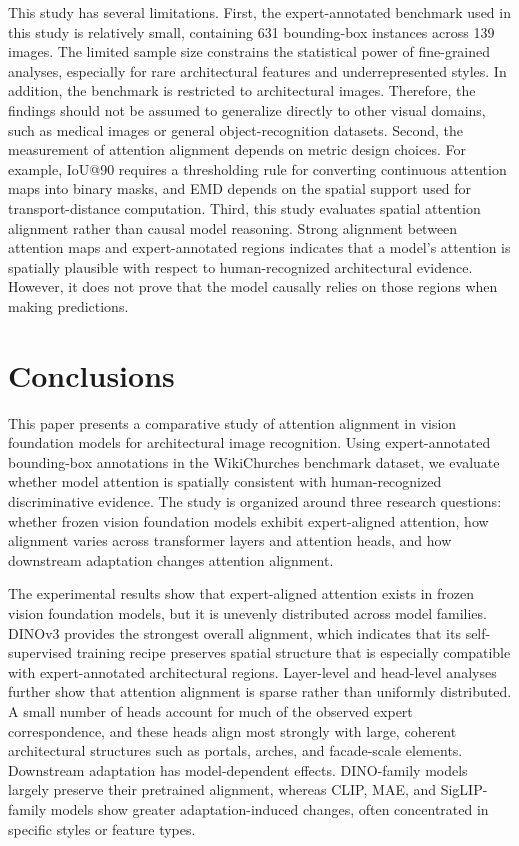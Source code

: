 \documentclass[lineno,pdflatex,sn-mathphys-num]{sn-jnl}%
\theoremstyle{thmstyleone}%
\theoremstyle{thmstyletwo}%
\theoremstyle{thmstylethree}%
\begin{document}
This study has several limitations. First, the expert-annotated benchmark \cite{Barz21WikiChurches} used in this study is relatively small, containing 631 bounding-box instances across 139 images. The limited sample size constrains the statistical power of fine-grained analyses, especially for rare architectural features and underrepresented styles. In addition, the benchmark is restricted to architectural images. Therefore, the findings should not be assumed to generalize directly to other visual domains, such as medical images or general object-recognition datasets. Second, the measurement of attention alignment depends on metric design choices. For example, IoU@90 requires a thresholding rule for converting continuous attention maps into binary masks, and EMD depends on the spatial support used for transport-distance computation. Third, this study evaluates spatial attention alignment rather than causal model reasoning. Strong alignment between attention maps and expert-annotated regions indicates that a model's attention is spatially plausible with respect to human-recognized architectural evidence. However, it does not prove that the model causally relies on those regions when making predictions. 

\section{Conclusions} \label{section conclusions}

This paper presents a comparative study of attention alignment in vision foundation models for architectural image recognition. Using expert-annotated bounding-box annotations in the WikiChurches benchmark dataset, we evaluate whether model attention is spatially consistent with human-recognized discriminative evidence. The study is organized around three research questions: whether frozen vision foundation models exhibit expert-aligned attention, how alignment varies across transformer layers and attention heads, and how downstream adaptation changes attention alignment.

The experimental results show that expert-aligned attention exists in frozen vision foundation models, but it is unevenly distributed across model families. DINOv3 provides the strongest overall alignment, which indicates that its self-supervised training recipe preserves spatial structure that is especially compatible with expert-annotated architectural regions. Layer-level and head-level analyses further show that attention alignment is sparse rather than uniformly distributed. A small number of heads account for much of the observed expert correspondence, and these heads align most strongly with large, coherent architectural structures such as portals, arches, and facade-scale elements. Downstream adaptation has model-dependent effects. DINO-family models largely preserve their pretrained alignment, whereas CLIP, MAE, and SigLIP-family models show greater adaptation-induced changes, often concentrated in specific styles or feature types.
\end{document}
